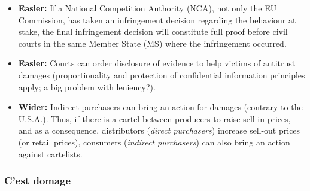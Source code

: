         \begin{itemize}
            \item \textbf{Easier:} If a National Competition Authority (NCA), not only the EU Commission, has taken an infringement decision regarding the behaviour at stake, the final infringement decision will constitute full proof before civil courts in the same Member State (MS) where the infringement occurred.
            \item \textbf{Easier:} Courts can order disclosure of evidence to help victims of antitrust damages (proportionality and protection of confidential information principles apply; a big problem with leniency?).
            \item \textbf{Wider:} Indirect purchasers can bring an action for damages (contrary to the U.S.A.). Thus, if there is a cartel between producers to raise sell-in prices, and as a consequence, distributors (\textit{direct purchasers}) increase sell-out prices (or retail prices), consumers (\textit{indirect purchasers}) can also bring an action against cartelists.
        \end{itemize}

        \subsubsection{C’est domage}

